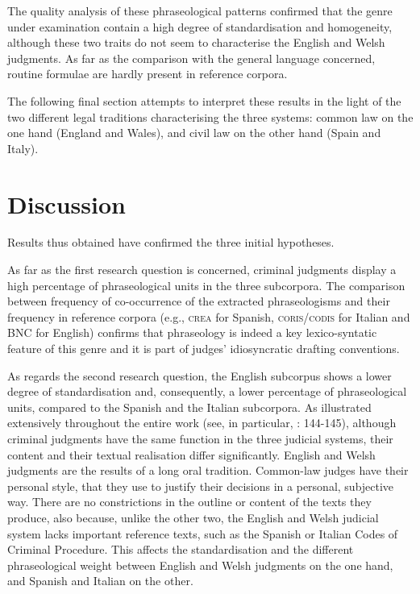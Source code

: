 \documentclass[output=paper]{LSP/langsci}
\begin{document}
The quality analysis of these phraseological patterns \citep[255-261]{
Pontrandolfo2013b} confirmed that the genre under examination contain a high degree of standardisation and homogeneity, although these two traits do not seem to characterise the English and Welsh judgments. As far as the comparison with the general language concerned, routine formulae are hardly present in reference corpora.

The following final section attempts to interpret these results in the light of the two different legal traditions characterising the three systems: common law on the one hand (England and Wales), and civil law on the other hand (Spain and Italy).

\section{Discussion} \label{sec:6:7}
Results thus obtained have confirmed the three initial hypotheses.

As far as the first research question is concerned, criminal judgments display a high percentage of phraseological units in the three subcorpora. The comparison between frequency of co-occurrence of the extracted phraseologisms and their frequency in reference corpora (e.g., \textsc{crea} for Spanish, \textsc{coris}/\textsc{codis} for Italian and BNC for English) confirms that phraseology is indeed a key lexico-syntatic feature of this genre and it is part of judges’ idiosyncratic drafting conventions.
 
As regards the second research question, the English subcorpus shows a lower degree of standardisation and, consequently, a lower percentage of phraseological units, compared to the Spanish and the Italian subcorpora. As illustrated extensively throughout the entire work (see, in particular, \citealt{Pontrandolfo2013a}: 144-145), although criminal judgments have the same function in the three judicial systems, their content and their textual realisation differ significantly. English and Welsh judgments are the results of a long oral tradition. Common-law judges have their personal style, that they use to justify their decisions in a personal, subjective way. There are no constrictions in the outline or content of the texts they produce, also because, unlike the other two, the English and Welsh judicial system lacks important reference texts, such as the Spanish or Italian Codes of Criminal Procedure. This affects the standardisation and the different phraseological weight between English and Welsh judgments on the one hand, and Spanish and Italian on the other.
\end{document}
